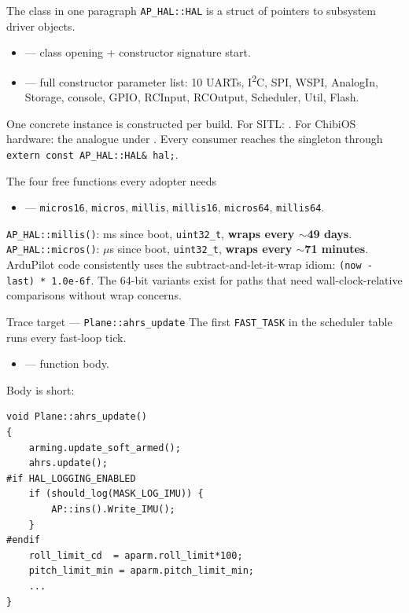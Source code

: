 \documentclass[aspectratio=169,11pt]{beamer}
\begin{document}
\begin{frame}{The class in one paragraph}
  \texttt{AP\_HAL::HAL} is a struct of pointers to subsystem driver objects.
  \begin{itemize}
    \item {} --- class opening + constructor signature start.
    \item {} --- full constructor parameter list: 10 UARTs, I\textsuperscript{2}C, SPI, WSPI, AnalogIn, Storage, console, GPIO, RCInput, RCOutput, Scheduler, Util, Flash.
  \end{itemize}
  \vfill
  One concrete instance is constructed per build. For SITL: . For ChibiOS hardware: the analogue under .
  \vfill
  Every consumer reaches the singleton through \texttt{extern const AP\_HAL::HAL\& hal;}.
\end{frame}

\begin{frame}[allowframebreaks]{The four free functions every adopter needs}
  \begin{itemize}
    \item {} --- \texttt{micros16}, \texttt{micros}, \texttt{millis}, \texttt{millis16}, \texttt{micros64}, \texttt{millis64}.
  \end{itemize}
  \vfill
  \texttt{AP\_HAL::millis()}: ms since boot, \texttt{uint32\_t}, \textbf{wraps every $\sim$49 days}.\\
  \texttt{AP\_HAL::micros()}: $\mu$s since boot, \texttt{uint32\_t}, \textbf{wraps every $\sim$71 minutes}.
  \vfill
  ArduPilot code consistently uses the subtract-and-let-it-wrap idiom: \texttt{(now - last) * 1.0e-6f}. The 64-bit variants exist for paths that need wall-clock-relative comparisons without wrap concerns.
\end{frame}

\begin{frame}[fragile]{Trace target --- \texttt{Plane::ahrs\_update}}
  The first \texttt{FAST\_TASK} in the scheduler table runs every fast-loop tick.
  \begin{itemize}
    \item {} --- function body.
  \end{itemize}
  \vfill
  Body is short:
  \begin{Verbatim}[fontsize=\small,frame=single]
void Plane::ahrs_update()
{
    arming.update_soft_armed();
    ahrs.update();
#if HAL_LOGGING_ENABLED
    if (should_log(MASK_LOG_IMU)) {
        AP::ins().Write_IMU();
    }
#endif
    roll_limit_cd  = aparm.roll_limit*100;
    pitch_limit_min = aparm.pitch_limit_min;
    ...
}
  \end{Verbatim}
\end{frame}
\end{document}
